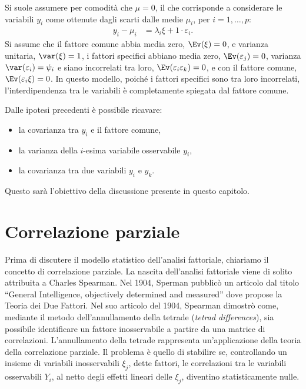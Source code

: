 \bigskip

Si suole assumere per comodità che $\mu=0$, il che corrisponde a considerare le variabili $y_i$ come ottenute dagli scarti dalle medie $\mu_i$, per $i = 1, \dots, p$:
\begin{align}
  y_i -\mu_i &= \lambda_i \xi + 1 \cdot \varepsilon_i.
\label{eq:mod_monofattoriale}
\end{align}
Si  assume che 
 il fattore comune abbia media zero, $\Ev(\xi)=0$, e 
varianza unitaria, $\var(\xi)=1$, 
  i fattori specifici
abbiano media zero, $\Ev(\varepsilon_j)=0$, varianza
$\var(\varepsilon_i)=\psi_{i}$ e siano incorrelati tra loro, $\Ev(\varepsilon_i \varepsilon_k)=0$, e con il fattore comune, $\Ev(\varepsilon_i \xi)=0$.  
In questo modello, poich{\'e} i fattori specifici sono tra loro incorrelati,
l'interdipendenza tra le variabili è completamente spiegata dal
fattore comune. 

Dalle ipotesi precedenti è possibile ricavare:
\begin{itemize}
\item la covarianza tra $y_i$ e il fattore comune, 
\item la varianza della $i$-esima variabile osservabile $y_i$,
\item la covarianza tra due variabili $y_i$ e $y_k$. 
\end{itemize}
Questo sarà l'obiettivo della discussione presente in questo capitolo.


\section{Correlazione parziale}

Prima di discutere il modello statistico dell'analisi fattoriale, chiariamo il concetto di correlazione parziale.
La nascita dell'analisi fattoriale viene di solito attribuita a Charles Spearman. 
Nel 1904, Sperman pubblicò un articolo dal titolo ``General Intelligence, objectively determined and measured'' dove propose la Teoria dei Due Fattori.
Nel suo articolo del 1904, Spearman dimostrò come, mediante il metodo dell'annullamento della tetrade (\emph{tetrad differences}), sia possibile identificare un fattore inosservabile a partire da una matrice di correlazioni.
L'annullamento della tetrade rappresenta un'applicazione della teoria della correlazione parziale.  
Il problema è quello di stabilire se, controllando un insieme di variabili inosservabili $\xi_j$, dette fattori, le correlazioni tra le variabili osservabili $Y_i$, al netto degli effetti lineari delle $\xi_j$, diventino statisticamente nulle. 


